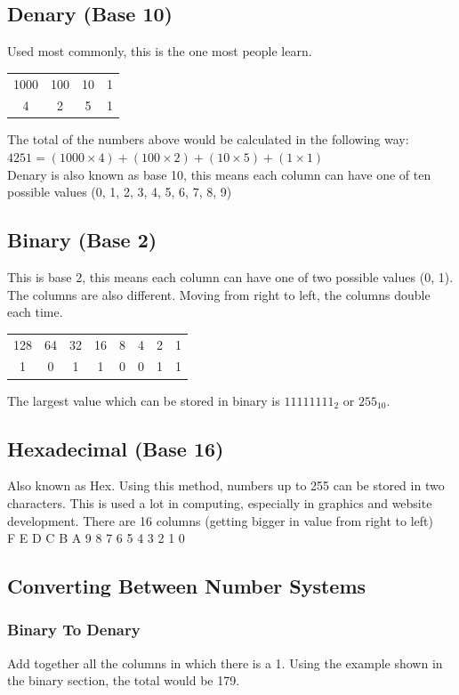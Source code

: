 \documentclass[a4paper,11pt, twocolumn]{article}
\begin{document}
\subsection{Denary (Base 10)}
Used most commonly, this is the one most people learn.
\begin{table}[H]
    \centering
    \begin{tabularx}{0.9\linewidth}{c c c c}
        1000 & 100 & 10 & 1 \\
        4 & 2 & 5 & 1
    \end{tabularx}
\end{table}
\noindent The total of the numbers above would be calculated in the following way:\\
$4251=(1000\times 4) + (100 \times 2) + (10 \times 5) + (1 \times 1)$\\
Denary is also known as base 10, this means each column can have one of ten possible values (0, 1, 2, 3, 4, 5, 6, 7, 8, 9)
\subsection{Binary (Base 2)}
This is base 2, this means each column can have one of two possible values (0, 1). The columns are also different. Moving from right to left, the columns double each time.
\begin{table}[H]
    \centering
    \begin{tabularx}{0.9\linewidth}{c c c c c c c c}
        128 & 64 & 32 & 16 & 8 & 4 & 2 & 1 \\
        1 & 0 & 1 & 1 & 0 & 0 & 1 & 1
    \end{tabularx}
\end{table}
\noindent The largest value which can be stored in binary is $11111111_2$ or $255_{10}$.
\subsection{Hexadecimal (Base 16)}
Also known as Hex. Using this method, numbers up to 255 can be stored in two characters. This is used a lot in computing, especially in graphics and website development. There are 16 columns (getting bigger in value from right to left)\\
F E D C B A 9 8 7 6 5 4 3 2 1 0 
\subsection{Converting Between Number Systems}
\subsubsection{Binary To Denary}
Add together all the columns in which there is a 1. Using the example shown in the binary section, the total would be 179.
\end{document}
